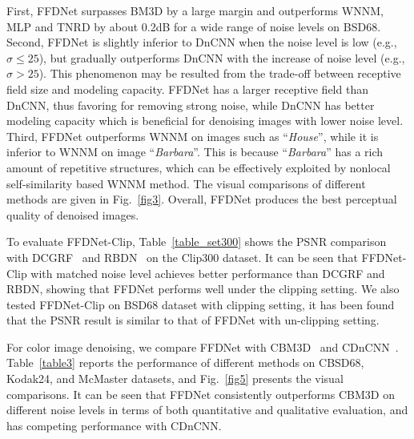 \documentclass[journal]{IEEEtran}
\begin{document}
First, FFDNet surpasses BM3D by a large margin and outperforms WNNM, MLP and TNRD by about 0.2dB for a wide range of noise levels on BSD68. Second, FFDNet is slightly inferior to DnCNN when the noise level is low (e.g., $\sigma \leq 25$), but gradually outperforms DnCNN with the increase of noise level (e.g., $\sigma > 25$).
This phenomenon may be resulted from the trade-off between receptive field size and modeling capacity. FFDNet has a larger receptive field than DnCNN, thus favoring for removing strong noise, while DnCNN has better modeling capacity which is beneficial for denoising images with lower noise level. Third, FFDNet outperforms WNNM on images such as ``\emph{House}'', while it is inferior to WNNM on image ``\emph{Barbara}''.
This is because ``\emph{Barbara}'' has a rich amount of repetitive structures, which can be effectively exploited by nonlocal self-similarity based WNNM method. The visual comparisons of different methods are given in Fig.~\ref{fig3}.
Overall, FFDNet produces the best perceptual quality of denoised images.





To evaluate FFDNet-Clip, Table~\ref{table_set300} shows the PSNR comparison with DCGRF~\cite{Vemulapalli_2016_CVPR} and RBDN~\cite{santhanam2016generalized} on the Clip300 dataset.
It can be seen that FFDNet-Clip with matched noise level achieves better performance than DCGRF and RBDN, showing that FFDNet performs well under the clipping setting.
We also tested FFDNet-Clip on BSD68 dataset with clipping setting, it has been found that the PSNR result is similar to that of FFDNet with un-clipping setting.



For color image denoising, we compare FFDNet with CBM3D~\cite{dabov2007image} and CDnCNN~\cite{zhang2017beyond}.
Table~\ref{table3} reports the performance of different methods on CBSD68, Kodak24, and McMaster datasets, and
Fig.~\ref{fig5} presents the visual comparisons. It can be seen that FFDNet consistently outperforms CBM3D on different noise levels in terms of both quantitative and qualitative evaluation, and has competing performance with CDnCNN.
\end{document}
